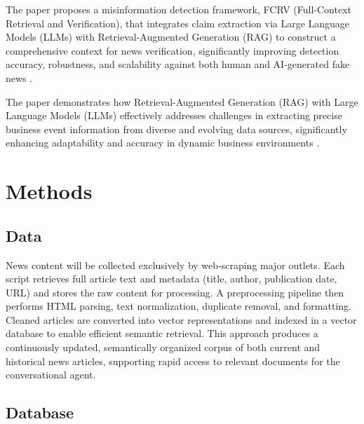 \documentclass[fleqn,moreauthors,10pt]{ds_report}
\begin{document}
    The paper proposes a misinformation detection framework, FCRV (Full-Context Retrieval and Verification), that integrates claim extraction via Large Language Models (LLMs) with Retrieval-Augmented Generation (RAG) to construct a comprehensive context for news verification, significantly improving detection accuracy, robustness, and scalability against both human and AI-generated fake news \cite{10826000}.

    The paper demonstrates how Retrieval-Augmented Generation (RAG) with Large Language Models (LLMs) effectively addresses challenges in extracting precise business event information from diverse and evolving data sources, significantly enhancing adaptability and accuracy in dynamic business environments \cite{ARSLAN20244534}.



\section*{Methods}



\subsection*{Data}

News content will be collected exclusively by web‑scraping major outlets. Each script retrieves full article text and metadata (title, author, publication date, URL) and stores the raw content for processing. A preprocessing pipeline then performs HTML parsing, text normalization, duplicate removal, and formatting. Cleaned articles are converted into vector representations and indexed in a vector database to enable efficient semantic retrieval. This approach produces a continuously updated, semantically organized corpus of both current and historical news articles, supporting rapid access to relevant documents for the conversational agent.

\subsection*{Database}
\end{document}
